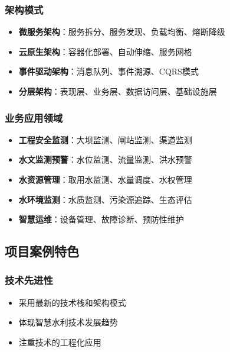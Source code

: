 \subsubsection{架构模式}\label{ux67b6ux6784ux6a21ux5f0f}

\begin{itemize}
\tightlist
\item
  \textbf{微服务架构}：服务拆分、服务发现、负载均衡、熔断降级
\item
  \textbf{云原生架构}：容器化部署、自动伸缩、服务网格
\item
  \textbf{事件驱动架构}：消息队列、事件溯源、CQRS模式
\item
  \textbf{分层架构}：表现层、业务层、数据访问层、基础设施层
\end{itemize}

\subsubsection{业务应用领域}\label{ux4e1aux52a1ux5e94ux7528ux9886ux57df}

\begin{itemize}
\tightlist
\item
  \textbf{工程安全监测}：大坝监测、闸站监测、渠道监测
\item
  \textbf{水文监测预警}：水位监测、流量监测、洪水预警
\item
  \textbf{水资源管理}：取用水监测、水量调度、水权管理
\item
  \textbf{水环境监测}：水质监测、污染源追踪、生态评估
\item
  \textbf{智慧运维}：设备管理、故障诊断、预防性维护
\end{itemize}

\subsection{项目案例特色}\label{ux9879ux76eeux6848ux4f8bux7279ux8272}

\subsubsection{技术先进性}\label{ux6280ux672fux5148ux8fdbux6027}

\begin{itemize}
\tightlist
\item
  采用最新的技术栈和架构模式
\item
  体现智慧水利技术发展趋势
\item
  注重技术的工程化应用
\end{itemize}

